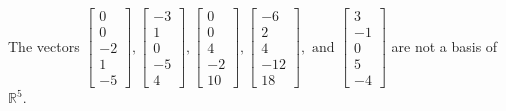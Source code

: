 \begin{exercise}
\begin{exerciseStatement}
  \end{exerciseStatement}
  \begin{exerciseAnswer}
   The vectors \(\left[\begin{array}{r}
0 \\
0 \\
-2 \\
1 \\
-5
\end{array}\right] , \left[\begin{array}{r}
-3 \\
1 \\
0 \\
-5 \\
4
\end{array}\right] , \left[\begin{array}{r}
0 \\
0 \\
4 \\
-2 \\
10
\end{array}\right] , \left[\begin{array}{r}
-6 \\
2 \\
4 \\
-12 \\
18
\end{array}\right] , \text{ and } \left[\begin{array}{r}
3 \\
-1 \\
0 \\
5 \\
-4
\end{array}\right]\) 
  	 are not  a basis of \(\mathbb{R}^5\).
  


  \end{exerciseAnswer}
\end{exercise}